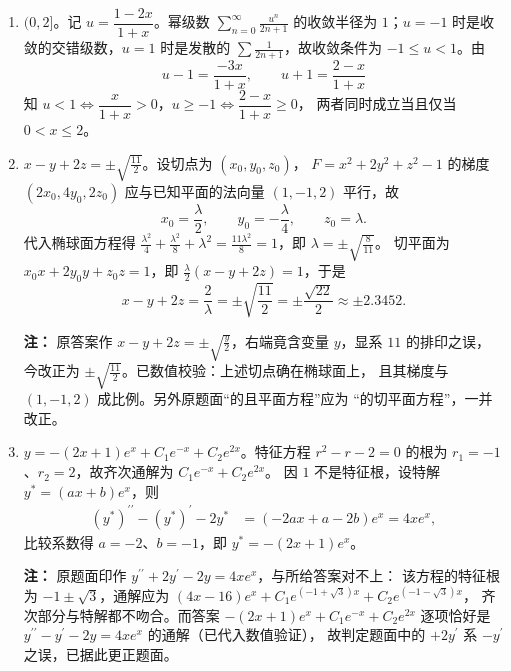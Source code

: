 \begin{enumerate}
{\begin{enumerate}
	\item
	$(0,2]$。记 $u=\dfrac{1-2x}{1+x}$。幂级数 $\sum\limits_{n=0}^{\infty}\frac{u^{n}}{2n+1}$
	的收敛半径为 $1$；$u=-1$ 时是收敛的交错级数，$u=1$ 时是发散的
	$\sum\frac{1}{2n+1}$，故收敛条件为 $-1\leqslant u<1$。由
	\[
	u-1=\frac{-3x}{1+x},\qquad u+1=\frac{2-x}{1+x}
	\]
	知 $u<1\iff\dfrac{x}{1+x}>0$，$u\geqslant-1\iff\dfrac{2-x}{1+x}\geqslant0$，
	两者同时成立当且仅当 $0<x\leqslant2$。

	\item
	$x-y+2z=\pm\sqrt{\frac{11}{2}}$。设切点为 $\left(x_{0},y_{0},z_{0}\right)$，
	$F=x^{2}+2y^{2}+z^{2}-1$ 的梯度 $\left(2x_{0},4y_{0},2z_{0}\right)$
	应与已知平面的法向量 $(1,-1,2)$ 平行，故
	\[
	x_{0}=\frac\lambda2,\qquad y_{0}=-\frac\lambda4,\qquad z_{0}=\lambda .
	\]
	代入椭球面方程得 $\frac{\lambda^{2}}{4}+\frac{\lambda^{2}}{8}+\lambda^{2}
	=\frac{11\lambda^{2}}{8}=1$，即 $\lambda=\pm\sqrt{\frac{8}{11}}$。
	切平面为 $x_{0}x+2y_{0}y+z_{0}z=1$，即 $\frac\lambda2(x-y+2z)=1$，于是
	\[
	x-y+2z=\frac{2}{\lambda}=\pm\sqrt{\frac{11}{2}}=\pm\frac{\sqrt{22}}{2}
	\approx\pm2.3452 .
	\]

	\par\vspace{1mm}\noindent
	\textbf{注：}{\kaishu
	原答案作 $x-y+2z=\pm\sqrt{\frac{y}{2}}$，右端竟含变量 $y$，显系 $11$ 的排印之误，
	今改正为 $\pm\sqrt{\frac{11}{2}}$。已数值校验：上述切点确在椭球面上，
	且其梯度与 $(1,-1,2)$ 成比例。另外原题面“的且平面方程”应为
	“的切平面方程”，一并改正。
	}\par

	\item
	$y=-(2x+1)e^{x}+C_{1}e^{-x}+C_{2}e^{2x}$。特征方程 $r^{2}-r-2=0$ 的根为
	$r_{1}=-1$、$r_{2}=2$，故齐次通解为 $C_{1}e^{-x}+C_{2}e^{2x}$。
	因 $1$ 不是特征根，设特解 $y^{*}=(ax+b)e^{x}$，则
	\begin{align*}
	\left(y^{*}\right)^{\prime\prime}-\left(y^{*}\right)^{\prime}-2y^{*}
	&=(-2ax+a-2b)e^{x}=4xe^{x},
	\end{align*}
	比较系数得 $a=-2$、$b=-1$，即 $y^{*}=-(2x+1)e^{x}$。

	\par\vspace{1mm}\noindent
	\textbf{注：}{\kaishu
	原题面印作 $y^{\prime\prime}+2y^{\prime}-2y=4xe^{x}$，与所给答案对不上：
	该方程的特征根为 $-1\pm\sqrt3$，通解应为
	$(4x-16)e^{x}+C_{1}e^{\left(-1+\sqrt3\right)x}+C_{2}e^{\left(-1-\sqrt3\right)x}$，
	齐次部分与特解都不吻合。而答案 $-(2x+1)e^{x}+C_{1}e^{-x}+C_{2}e^{2x}$
	逐项恰好是 $y^{\prime\prime}-y^{\prime}-2y=4xe^{x}$ 的通解（已代入数值验证），
	故判定题面中的 $+2y^{\prime}$ 系 $-y^{\prime}$ 之误，已据此更正题面。
	}\par
\end{enumerate}
}


\end{enumerate}
